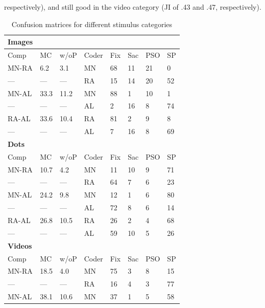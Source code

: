 respectively), and still good in the video category (JI of .43 and .47, respectively). \\


\begin{table}[h!]
	\caption{Confusion matrices for different stimulus categories}
	\label{tab:mclf}       %
	\begin{tabular}{llllllll}
		\textbf{Images}&&&&&&&\\
		\hline\noalign{\smallskip}
		Comp & MC & w/oP & Coder & Fix & Sac & PSO & SP \\
		\noalign{\smallskip}\hline\noalign{\smallskip}
		MN-RA & 6.2 & 3.1 & MN & 68 & 11 & 21 & 0  \\
		--- & --- & --- & RA & 15 & 14 & 20 & 52 \\
		MN-AL & 33.3 & 11.2 & MN & 88 & 1 & 10 & 1 \\
		--- & --- & --- & AL & 2 &  16 & 8 & 74 \\
		RA-AL & 33.6 & 10.4 & RA & 81 & 2 & 9 & 8 \\
		---& ---& ---& AL & 7 & 16 & 8 & 69 \\
		\noalign{\smallskip}
		\textbf{Dots}&&&&&&&\\
		\hline\noalign{\smallskip}
		Comp & MC & w/oP & Coder & Fix & Sac & PSO & SP \\
		\noalign{\smallskip}\hline\noalign{\smallskip}
		MN-RA & 10.7 & 4.2 & MN & 11 & 10 & 9 & 71  \\
		--- & --- & --- & RA & 64 & 7 & 6 & 23 \\
		MN-AL & 24.2 & 9.8 & MN & 12 & 1 & 6 & 80 \\
		--- & --- & --- & AL & 72 & 8 & 6 & 14\\
		RA-AL & 26.8 & 10.5 & RA & 26 & 2 & 4 & 68 \\
		---& ---& ---& AL & 59 & 10 & 5 & 26 \\
		\noalign{\smallskip}
		\textbf{Videos}&&&&&&&\\
		\hline\noalign{\smallskip}
		Comp & MC & w/oP & Coder & Fix & Sac & PSO & SP \\
		\noalign{\smallskip}\hline\noalign{\smallskip}
		MN-RA & 18.5 & 4.0 & MN & 75 & 3 & 8 & 15 \\
		--- & --- & --- & RA & 16 & 4 & 3 & 77 \\
		MN-AL & 38.1 & 10.6 & MN & 37 & 1 & 5 & 58 \\

\end{tabular}
\end{table}
